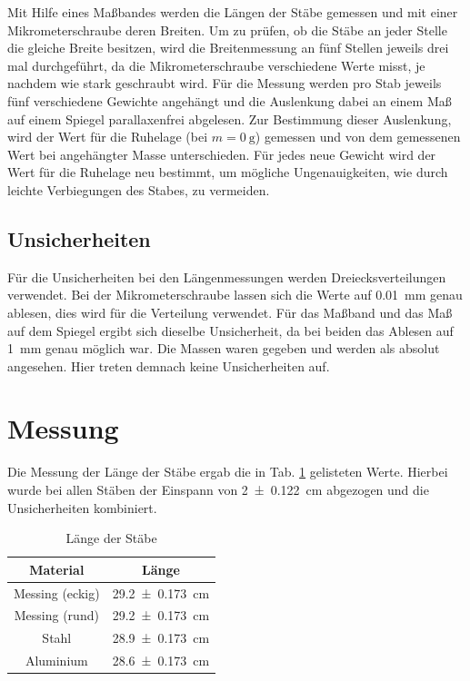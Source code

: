 \documentclass[11pt,a4paper,titlepage, ngerman]{article}
\begin{document}
		Mit Hilfe eines Maßbandes werden die Längen der Stäbe gemessen und mit einer Mikrometerschraube deren Breiten. Um zu prüfen, ob die Stäbe an jeder Stelle die gleiche Breite besitzen, wird die Breitenmessung an fünf Stellen jeweils drei mal durchgeführt, da die Mikrometerschraube verschiedene Werte misst, je nachdem wie stark geschraubt wird. 
		Für die Messung werden pro Stab jeweils fünf verschiedene Gewichte angehängt und die Auslenkung dabei an einem Maß auf einem Spiegel parallaxenfrei abgelesen. Zur Bestimmung dieser Auslenkung, wird der Wert für die Ruhelage (bei $m=\SI{0}{\g}$) gemessen und von dem gemessenen Wert bei angehängter Masse unterschieden. Für jedes neue Gewicht wird der Wert für die Ruhelage neu bestimmt, um mögliche Ungenauigkeiten, wie durch leichte Verbiegungen des Stabes, zu vermeiden.
		
		\subsection*{Unsicherheiten}
		Für die Unsicherheiten bei den Längenmessungen werden Dreiecksverteilungen verwendet. Bei der Mikrometerschraube lassen sich die Werte auf \SI{0,01}{\mm} genau ablesen, dies wird für die Verteilung verwendet. Für das Maßband und das Maß auf dem Spiegel ergibt sich dieselbe Unsicherheit, da bei beiden das Ablesen auf \SI{1}{\mm} genau möglich war.
		Die Massen waren gegeben und werden als absolut angesehen. Hier treten demnach keine Unsicherheiten auf.	
	\section{Messung}
		
		Die Messung der Länge der Stäbe ergab die in Tab. \ref{tab:Stablängen} gelisteten Werte. Hierbei wurde bei allen Stäben der Einspann von \SI{2+-0,122}{\cm} abgezogen und die Unsicherheiten kombiniert.
		\begin{table}[h]
			\caption{Länge der Stäbe}
			\centering
			\label{tab:Stablängen}
			\begin{tabular}{c|c}
				{Material} & {Länge}\\
				\hline
				{Messing (eckig)} & \SI{29,2+-0,173}{\cm}\\
				{Messing (rund)} &  \SI{29,2+-0,173}{\cm}\\
				{Stahl} & \SI{28,9+-0,173}{\cm}\\
				{Aluminium} & \SI{28,6+-0,173}{\cm}\\		
			\end{tabular}
		\end{table}
	
\end{document}
